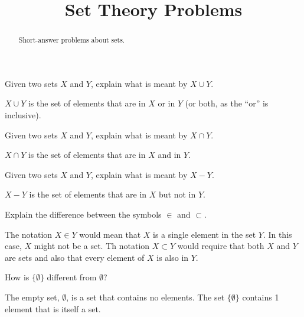 \documentclass{ximera}
\title{Set Theory Problems}
\begin{document}
\begin{abstract}
Short-answer problems about sets. 
\end{abstract}
\maketitle


\begin{problem}
Given two sets $X$ and $Y$, explain what is meant by $X\cup Y$.
\begin{freeResponse}
$X\cup Y$ is the set of elements that are in $X$ or in $Y$ (or both, as the ``or'' is inclusive).  
\end{freeResponse}
\end{problem}

\begin{problem}
Given two sets $X$ and $Y$, explain what is meant by $X\cap Y$.
\begin{freeResponse}
$X\cap Y$ is the set of elements that are in $X$ and in $Y$.  
\end{freeResponse}
\end{problem}

\begin{problem}
Given two sets $X$ and $Y$, explain what is meant by $X - Y$.
\begin{freeResponse}
$X - Y$ is the set of elements that are in $X$ but not in $Y$.  
\end{freeResponse}
\end{problem}

\begin{problem}
Explain the difference between the symbols $\in$ and $\subset$.
\begin{freeResponse}
The notation $X \in Y$ would mean that $X$ is a single element in the set $Y$.  In this case, $X$ might not be a set.  Th notation $X \subset Y$ would require that both $X$ and $Y$ are sets and also that every element of $X$ is also in $Y$.
\end{freeResponse}
\end{problem}

\begin{problem}
How is $\{\emptyset\}$ different from $\emptyset$?  
\begin{freeResponse}
The empty set, $\emptyset$, is a set that contains no elements.  The set $\{\emptyset\}$ contains 1 element that is itself a set.  
\end{freeResponse}
\end{problem}
\end{document}

